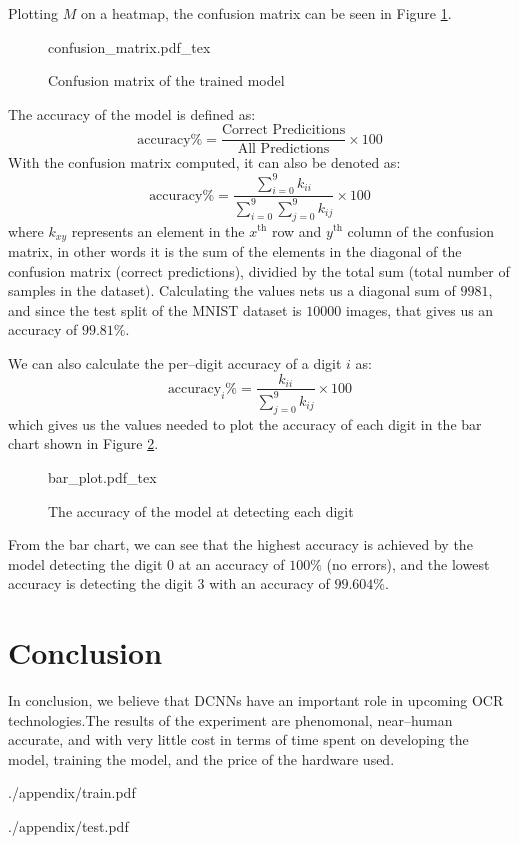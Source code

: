 \documentclass[conference]{IEEEtran}
\begin{document}
Plotting $M$ on a heatmap, the confusion matrix can be seen in Figure \ref{fig:confusion_matrix}.
\begin{figure}[!htp]
    \centering
    \def\svgwidth{\columnwidth}
    \scriptsize
    {confusion_matrix.pdf_tex}
    \caption{Confusion matrix of the trained model}\label{fig:confusion_matrix}
\end{figure}
\par The accuracy of the model is defined as:
\begin{equation}
    \text{accuracy\%}=\frac{\text{Correct Predicitions}}{\text{All Predictions}} \times 100
\end{equation}
With the confusion matrix computed, it can also be denoted as:
\begin{equation}
    \text{accuracy\%} = \frac{\sum_{i = 0}^9 k_{ii}}{\sum_{i = 0}^9 \sum_{j = 0}^9 k_{ij}} \times 100
\end{equation}
where $k_{xy}$ represents an element in the $x^\text{th}$ row and $y^\text{th}$ column of the confusion matrix, in other words it is the sum of the elements in the diagonal of the confusion matrix (correct predictions), dividied by the total sum (total number of samples in the dataset). Calculating the values nets us a diagonal sum of $9981$, and since the test split of the MNIST dataset is $10000$ images, that gives us an accuracy of $99.81\%$.
\par
We can also calculate the per--digit accuracy of a digit $i$ as:
\begin{equation}
    \text{accuracy}_{i}\% = \frac{k_{ii}}{\sum_{j = 0}^9 k_{ij}} \times 100
\end{equation}
which gives us the values needed to plot the accuracy of each digit in the bar chart shown in Figure \ref{fig:bar}.
\begin{figure}[!htp]
    \centering
    \def\svgwidth{\columnwidth}
    {bar_plot.pdf_tex}
    \caption{The accuracy of the model at detecting each digit}\label{fig:bar}
\end{figure}
\par From the bar chart, we can see that the highest accuracy is achieved by the model detecting the digit $0$ at an accuracy of $100\%$ (no errors), and the lowest accuracy is detecting the digit $3$ with an accuracy of $99.604\%$.
\section{Conclusion}
In conclusion, we believe that DCNNs have an important role in upcoming OCR technologies.\@ The results of the experiment are phenomonal, near--human accurate, and with very little cost in terms of time spent on developing the model, training the model, and the price of the hardware used.\@




\onecolumn


    {./appendix/train.pdf}

    {./appendix/test.pdf}
\end{document}
